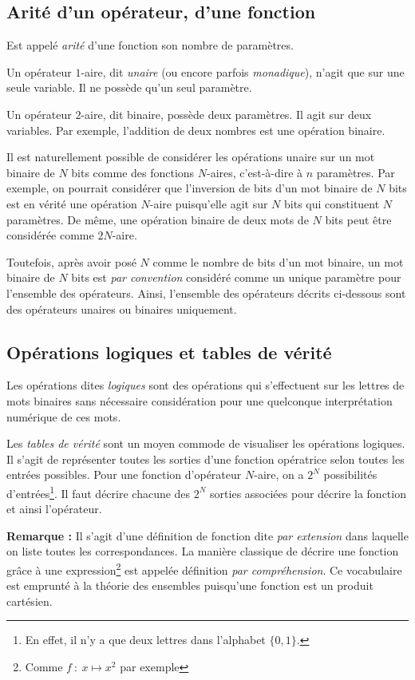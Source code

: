 \documentclass[../../main.tex]{subfiles}
\begin{document}
\subsection{Arité d'un opérateur, d'une fonction}
Est appelé \textit{arité} d'une fonction son nombre de paramètres.

Un opérateur $1$-aire, dit \textit{unaire} (ou encore parfois \textit{monadique}), n'agit que sur une seule variable. Il ne possède qu'un seul paramètre.

Un opérateur $2$-aire, dit binaire, possède deux paramètres. Il agit sur deux variables. Par exemple, l'addition de deux nombres est une opération binaire.

Il est naturellement possible de considérer les opérations unaire sur un mot binaire de $N$ bits comme des fonctions $N$-aires, c'est-à-dire à $n$ paramètres. Par exemple, on pourrait considérer que l'inversion de bits d'un mot binaire de $N$ bits est en vérité une opération $N$-aire puisqu'elle agit sur $N$ bits qui constituent $N$ paramètres. De même, une opération binaire de deux mots de $N$ bits peut être considérée comme $2N$-aire.

Toutefois, après avoir posé $N$ comme le nombre de bits d'un mot binaire, un mot binaire de $N$ bits est \textit{par convention} considéré comme un unique paramètre pour l'ensemble des opérateurs. Ainsi, l'ensemble des opérateurs décrits ci-dessous sont des opérateurs unaires ou binaires uniquement.
\subsection{Opérations logiques et tables de vérité}
Les opérations dites \textit{logiques} sont des opérations qui s'effectuent sur les lettres de mots binaires sans nécessaire considération pour une quelconque interprétation numérique de ces mots.

Les \textit{tables de vérité} sont un moyen commode de visualiser les opérations logiques. Il s'agit de représenter toutes les sorties d'une fonction opératrice selon toutes les entrées possibles. Pour une fonction d'opérateur $N$-aire, on a $2^{N}$ possibilités d'entrées\footnote{En effet, il n'y a que deux lettres dans l'alphabet $\{0, 1\}$.}. Il faut décrire chacune des $2^{N}$ sorties associées pour décrire la fonction et ainsi l'opérateur.

\textbf{Remarque :} Il s'agit d'une définition de fonction dite \textit{par extension} dans laquelle on liste toutes les correspondances. La manière classique de décrire une fonction grâce à une expression\footnote{Comme $f\ :\ x\mapsto{x^{2}}$ par exemple} est appelée définition \textit{par compréhension}. Ce vocabulaire est emprunté à la théorie des ensembles puisqu'une fonction est un produit cartésien.
\end{document}
